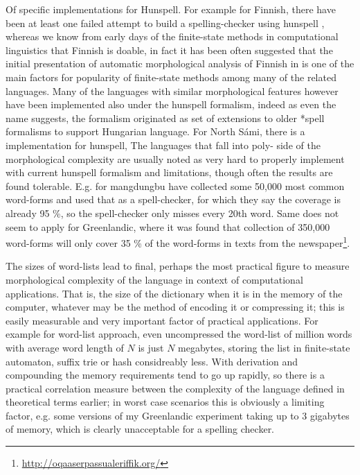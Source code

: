 \documentclass[officiallayout]{unihelcompling}
\begin{document}
Of specific implementations for Hunspell. For example for
Finnish, there have been at least one failed attempt to build a
spelling-checker using hunspell \citep{pitkanen2006hunspell}, whereas we know
from early days of the finite-state methods in computational linguistics that
Finnish is doable, in fact it has been often suggested that the initial
presentation of automatic morphological analysis of Finnish in
\citep{koskenniemi1983twolevel} is one of the main factors for popularity of
finite-state methods among many of the related languages. Many of the languages
with similar morphological features however have been implemented also under
the hunspell formalism, indeed as even the name suggests, the formalism
originated as set of extensions to older *spell formalisms to support Hungarian
language. For North Sámi, there is a implementation for hunspell, The languages
that fall into poly- side of the morphological complexity are usually noted as
very hard to properly implement with current hunspell formalism and
limitations, though often the results are found tolerable. E.g. for mangdungbu
\citep{} have collected some 50,000 most common
word-forms and used that as a spell-checker, for which they say the coverage is
already 95 \%, so the spell-checker only misses every 20th word. Same does not
seem to apply for Greenlandic, where it was found that collection of 350,000
word-forms will only cover 35 \% of the word-forms in texts from the
newspaper\footnote{\url{http://oqaaserpassualeriffik.org/}}.

The sizes of word-lists lead to final, perhaps the most practical figure to
measure morphological complexity of the language in context of computational
applications. That is, the size of the dictionary when it is in the memory of
the computer, whatever may be the method of encoding it or compressing it; this
is easily measurable and very important factor of practical applications.
For example for word-list approach, even uncompressed the word-list of million
words with average word length of $N$ is just $N$ megabytes, storing the list in
finite-state automaton, suffix trie or hash considreably less. With derivation
and compounding the memory requirements tend to go up rapidly, so there is
a practical correlation measure between the complexity of the language defined
in theoretical terms earlier; in worst case scenarios this is obviously a 
limiting factor, e.g. some versions of my Greenlandic experiment taking up
to 3 gigabytes of memory, which is clearly unacceptable for a spelling checker.
\end{document}
